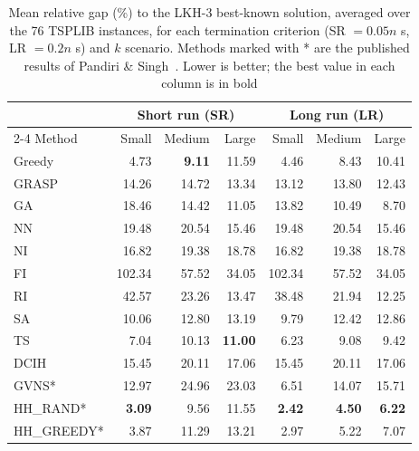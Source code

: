 \begin{table}[t]
\centering\small
\caption{Mean relative gap (\%) to the LKH-3 best-known solution, averaged over the 76 TSPLIB instances, for each termination criterion (SR $=0.05n$ s, LR $=0.2n$ s) and $k$ scenario. Methods marked with * are the published results of Pandiri \& Singh~\cite{pandiri2020}. Lower is better; the best value in each column is in bold}
\label{tab:gap}
\begin{tabular}{l rrr rrr}
\hline
 & \multicolumn{3}{c}{Short run (SR)} & \multicolumn{3}{c}{Long run (LR)} \\
\cline{2-4}\cline{5-7}
Method & Small & Medium & Large & Small & Medium & Large \\
\hline
Greedy & 4.73 & \textbf{9.11} & 11.59 & 4.46 & 8.43 & 10.41 \\
GRASP & 14.26 & 14.72 & 13.34 & 13.12 & 13.80 & 12.43 \\
GA & 18.46 & 14.42 & 11.05 & 13.82 & 10.49 & 8.70 \\
NN & 19.48 & 20.54 & 15.46 & 19.48 & 20.54 & 15.46 \\
NI & 16.82 & 19.38 & 18.78 & 16.82 & 19.38 & 18.78 \\
FI & 102.34 & 57.52 & 34.05 & 102.34 & 57.52 & 34.05 \\
RI & 42.57 & 23.26 & 13.47 & 38.48 & 21.94 & 12.25 \\
SA & 10.06 & 12.80 & 13.19 & 9.79 & 12.42 & 12.86 \\
TS & 7.04 & 10.13 & \textbf{11.00} & 6.23 & 9.08 & 9.42 \\
DCIH & 15.45 & 20.11 & 17.06 & 15.45 & 20.11 & 17.06 \\
GVNS* & 12.97 & 24.96 & 23.03 & 6.51 & 14.07 & 15.71 \\
HH\_RAND* & \textbf{3.09} & 9.56 & 11.55 & \textbf{2.42} & \textbf{4.50} & \textbf{6.22} \\
HH\_GREEDY* & 3.87 & 11.29 & 13.21 & 2.97 & 5.22 & 7.07 \\
\hline
\end{tabular}
\end{table}
